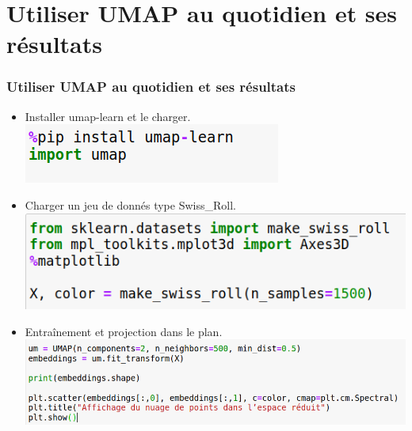 \documentclass{beamer}
\theoremstyle{definition}
\begin{document}
\section{Utiliser UMAP au quotidien et ses résultats}
\begin{frame}
	\frametitle{Utiliser UMAP au quotidien et ses résultats}
	\begin{itemize}
		\item Installer umap-learn et le charger.\\[0.25cm]
		
		\includegraphics[scale=0.3]{1.png}
		
		\item Charger un jeu de donnés type Swiss\_Roll.\\[0.25cm]

		\includegraphics[scale=0.3]{2.png}
		
		\item Entraînement et projection dans le plan.\\[0.25cm]
		
		\includegraphics[scale=0.3]{3.png}
		
	\end{itemize}
	
\end{frame}
\end{document}
